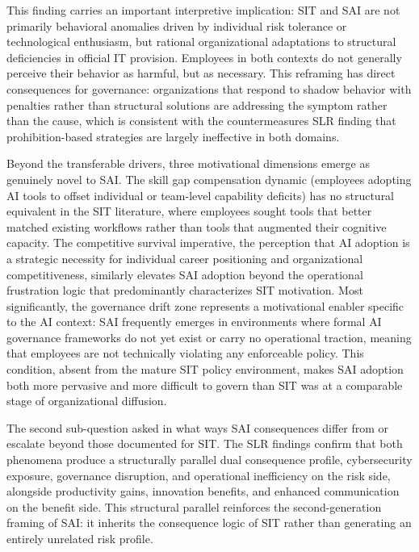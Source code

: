 \documentclass[12pt,oneside]{article}
\begin{document}
This finding carries an important interpretive implication: \ac{SIT} and \ac{SAI} are not primarily behavioral anomalies driven by individual risk tolerance or technological enthusiasm, but rational organizational adaptations to structural deficiencies in official \ac{IT} provision. Employees in both contexts do not generally perceive their behavior as harmful, but as necessary. This reframing has direct consequences for governance: organizations that respond to shadow behavior with penalties rather than structural solutions are addressing the symptom rather than the cause, which is consistent with the countermeasures \ac{SLR} finding that prohibition-based strategies are largely ineffective in both domains.

Beyond the transferable drivers, three motivational dimensions emerge as genuinely novel to \ac{SAI}. The skill gap compensation dynamic (employees adopting \ac{AI} tools to offset individual or team-level capability deficits) has no structural equivalent in the \ac{SIT} literature, where employees sought tools that better matched existing workflows rather than tools that augmented their cognitive capacity. The competitive survival imperative, the perception that \ac{AI} adoption is a strategic necessity for individual career positioning and organizational competitiveness, similarly elevates \ac{SAI} adoption beyond the operational frustration logic that predominantly characterizes \ac{SIT} motivation. Most significantly, the governance drift zone represents a motivational enabler specific to the \ac{AI} context: \ac{SAI} frequently emerges in environments where formal \ac{AI} governance frameworks do not yet exist or carry no operational traction, meaning that employees are not technically violating any enforceable policy. This condition, absent from the mature \ac{SIT} policy environment, makes \ac{SAI} adoption both more pervasive and more difficult to govern than \ac{SIT} was at a comparable stage of organizational diffusion.

The second sub-question asked in what ways \ac{SAI} consequences differ from or escalate beyond those documented for \ac{SIT}. The \ac{SLR} findings confirm that both phenomena produce a structurally parallel dual consequence profile, cybersecurity exposure, governance disruption, and operational inefficiency on the risk side, alongside productivity gains, innovation benefits, and enhanced communication on the benefit side. This structural parallel reinforces the second-generation framing of \ac{SAI}: it inherits the consequence logic of \ac{SIT} rather than generating an entirely unrelated risk profile.
\end{document}
